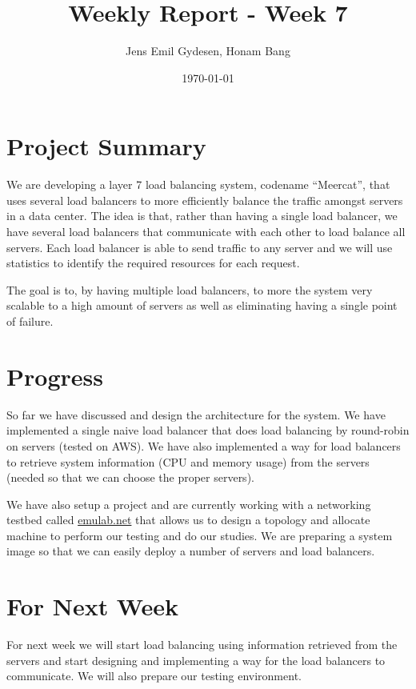 \documentclass[11pt,letter]{article}
\author{Jens Emil Gydesen, Honam Bang}
\date{\today}
\title{Weekly Report - Week 7}
\begin{document}
\maketitle
\section{Project Summary}
We are developing a layer 7 load balancing system, codename ``Meercat'', that uses several load balancers to more efficiently balance the traffic amongst servers in a data center. The idea is that, rather than having a single load balancer, we have several load balancers that communicate with each other to load balance all servers. Each load balancer is able to send traffic to any server and we will use statistics to identify the required resources for each request.

The goal is to, by having multiple load balancers, to more the system very scalable to a high amount of servers as well as eliminating having a single point of failure. 
\section{Progress}
So far we have discussed and design the architecture for the system. We have implemented a single naive load balancer that does load balancing by round-robin on servers (tested on AWS). We have also implemented a way for load balancers to retrieve system information (CPU and memory usage) from the servers (needed so that we can choose the proper servers). 

We have also setup a project and are currently working with a networking testbed called \url{emulab.net} that allows us to design a topology and allocate machine to perform our testing and do our studies. We are preparing a system image so that we can easily deploy a number of servers and load balancers. 
\section{For Next Week}
For next week we will start load balancing using information retrieved from the servers and start designing and implementing a way for the load balancers to communicate. We will also prepare our testing environment. 
\end{document}
